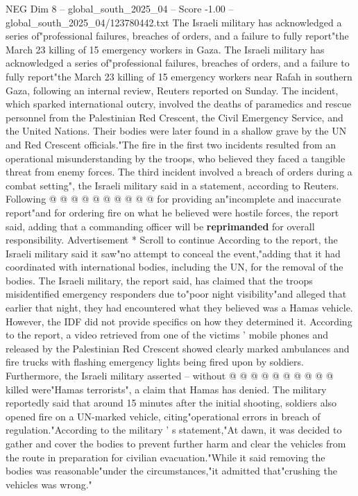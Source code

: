 \begin{textsample}{NEG Dim 8 – global\_south\_2025\_04 – Score -1.00 – global\_south\_2025\_04/123780442.txt}  \label{ex:f8_neg_284}
The Israeli military has acknowledged a series of"professional failures, breaches of orders, and a failure to fully report"the March 23 killing of 15 emergency workers in Gaza.
The Israeli military has acknowledged a series of"professional failures, breaches of orders, and a failure to fully report"the March 23 killing of 15 emergency workers near Rafah in southern Gaza, following an internal review, Reuters reported on Sunday.
The incident, which sparked international outcry, involved the deaths of paramedics and rescue personnel from the Palestinian Red Crescent, the Civil Emergency Service, and the United Nations.
Their bodies were later found in a shallow grave by the UN and Red Crescent officials."The fire in the first two incidents resulted from an operational misunderstanding by the troops, who believed they faced a tangible threat from enemy forces.
The third incident involved a breach of orders during a combat setting", the Israeli military said in a statement, according to Reuters.
Following @ @ @ @ @ @ @ @ @ @ for providing an"incomplete and inaccurate report"and for ordering fire on what he believed were hostile forces, the report said, adding that a commanding officer will be \textbf{reprimanded} for overall responsibility.
Advertisement * Scroll to continue According to the report, the Israeli military said it saw"no attempt to conceal the event,"adding that it had coordinated with international bodies, including the UN, for the removal of the bodies.
The Israeli military, the report said, has claimed that the troops misidentified emergency responders due to"poor night visibility"and alleged that earlier that night, they had encountered what they believed was a Hamas vehicle.
However, the IDF did not provide specifics on how they determined it.
According to the report, a video retrieved from one of the victims ' mobile phones and released by the Palestinian Red Crescent showed clearly marked ambulances and fire trucks with flashing emergency lights being fired upon by soldiers.
Furthermore, the Israeli military asserted -- without @ @ @ @ @ @ @ @ @ @ killed were"Hamas terrorists", a claim that Hamas has denied.
The military reportedly said that around 15 minutes after the initial shooting, soldiers also opened fire on a UN-marked vehicle, citing"operational errors in breach of regulation."According to the military ' s statement,"At dawn, it was decided to gather and cover the bodies to prevent further harm and clear the vehicles from the route in preparation for civilian evacuation."While it said removing the bodies was reasonable"under the circumstances,"it admitted that"crushing the vehicles was wrong."

\end{textsample}
